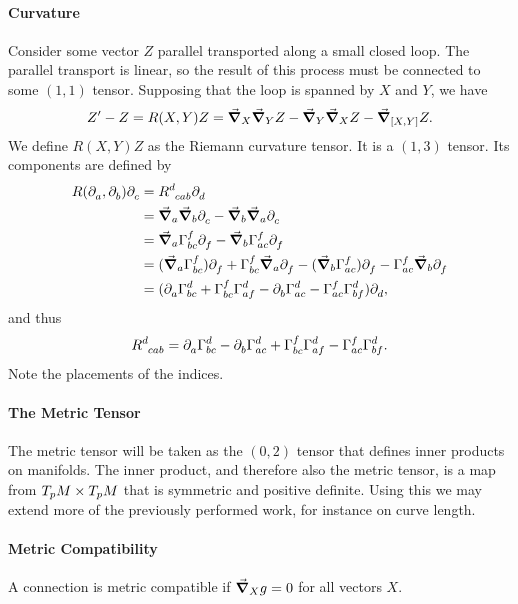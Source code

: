 \paragraph{Curvature}
Consider some vector $Z$ parallel transported along a small closed loop. The parallel transport is linear, so the result of this process must be connected to some $(1, 1)$ tensor. Supposing that the loop is spanned by $X$ and $Y$, we have
\begin{align*}
	Z^{\prime} - Z = R(X, Y)Z = \dcov{X}{\dcov{Y}{Z}} - \dcov{Y}{\dcov{X}{Z}} - \dcov{\comm{X}{Y}}{Z}.
\end{align*}
We define $R(X, Y)Z$ as the Riemann curvature tensor. It is a $(1, 3)$ tensor. Its components are defined by
\begin{align*}
	R(\del{a}{}, \del{b}{})\del{c}{} &= \tensor{R}{^{d}_{cab}}\del{d}{} \\
	                                 &= \dcov{a}{\dcov{b}{\del{c}{}}} - \dcov{b}{\dcov{a}{\del{c}{}}} \\
	                                 &= \dcov{a}{\chris{f}{b}{c}\del{f}{}} - \dcov{b}{\chris{f}{a}{c}\del{f}{}} \\
	                                 &= (\dcov{a}{\chris{f}{b}{c}})\del{f}{} + \chris{f}{b}{c}\dcov{a}{\del{f}{}} - (\dcov{b}{\chris{f}{a}{c}})\del{f}{} - \chris{f}{a}{c}\dcov{b}{\del{f}{}} \\
	                                 &= (\del{a}{\chris{d}{b}{c}} + \chris{f}{b}{c}\chris{d}{a}{f} - \del{b}{\chris{d}{a}{c}} - \chris{f}{a}{c}\chris{d}{b}{f})\del{d}{}, 
\end{align*}
and thus
\begin{align*}
	\tensor{R}{^{d}_{cab}} = \del{a}{\chris{d}{b}{c}} - \del{b}{\chris{d}{a}{c}} + \chris{f}{b}{c}\chris{d}{a}{f} - \chris{f}{a}{c}\chris{d}{b}{f}.
\end{align*}
Note the placements of the indices.

\paragraph{The Metric Tensor}
The metric tensor will be taken as the $(0, 2)$ tensor that defines inner products on manifolds. The inner product, and therefore also the metric tensor, is a map from $T_{p}M\times T_{p}M$ that is symmetric and positive definite. Using this we may extend more of the previously performed work, for instance on curve length.

\paragraph{Metric Compatibility}
A connection is metric compatible if $\grad_{X}{g} = 0$ for all vectors $X$.

